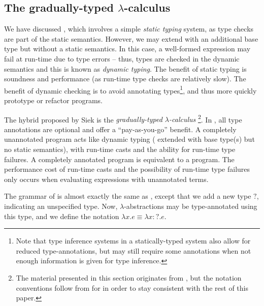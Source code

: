 
\subsection{The gradually-typed $\lambda$-calculus}
\label{sec:gradual}


We have discussed \stlc{}, which involves a simple \textit{static typing} system, as type checks are part of the static semantics. However, we may extend \ulc{} with an additional base type but without a static semantics. In this case, a well-formed expression may fail at run-time due to type errors -- thus, types are checked in the dynamic semantics and this is known as \textit{dynamic typing}. The benefit of static typing is soundness and performance (as run-time type checks are relatively slow). The benefit of dynamic checking is to avoid annotating types\footnote{Note that type inference systems in a statically-typed system also allow for reduced type-annotations, but may still require some annotations when not enough information is given for type inference.}, and thus more quickly prototype or refactor programs.

The hybrid proposed by Siek is the \textit{gradually-typed $\lambda$-calculus} \gtlc{} \cite{Siek06gradualtyping,siek2015refined}\footnote{The material presented in this section originates from \cite{Siek06gradualtyping,siek2015refined}, but the notation conventions follow from \cite{conf/popl/HazelnutLive19} for in order to stay consistent with the rest of this paper.}. In \gtlc{}, all type annotations are optional and offer a ``pay-as-you-go'' benefit. A completely unannotated \gtlc{} program acts like dynamic typing (\ulc{} extended with base type(s) but no static semantics), with run-time casts and the ability for run-time type failures. A completely annotated \gtlc{} program is equivalent to a \stlc{} program. The performance cost of run-time casts and the possibility of run-time type failures only occurs when evaluating expressions with unannotated terms.

The grammar of \gtlc{} is almost exactly the same as \stlc, except that we add a new type $?$, indicating an unspecified type. Now, $\lambda$-abstractions may be type-annotated using this type, and we define the notation $\lambda x.e\equiv\lambda x:?.e$.

